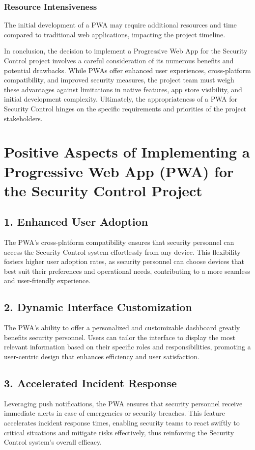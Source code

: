 \documentclass[journal]{IEEEtran}
\begin{document}
	\subsubsection*{Resource Intensiveness}
	The initial development of a PWA may require additional resources and time compared to traditional web applications, impacting the project timeline.
	
	In conclusion, the decision to implement a Progressive Web App for the Security Control project involves a careful consideration of its numerous benefits and potential drawbacks. While PWAs offer enhanced user experiences, cross-platform compatibility, and improved security measures, the project team must weigh these advantages against limitations in native features, app store visibility, and initial development complexity. Ultimately, the appropriateness of a PWA for Security Control hinges on the specific requirements and priorities of the project stakeholders.
	
	\section*{Positive Aspects of Implementing a Progressive Web App (PWA) for the Security Control Project}
	\subsection*{1. Enhanced User Adoption}
	The PWA's cross-platform compatibility ensures that security personnel can access the Security Control system effortlessly from any device. This flexibility fosters higher user adoption rates, as security personnel can choose devices that best suit their preferences and operational needs, contributing to a more seamless and user-friendly experience.
	
	\subsection*{2. Dynamic Interface Customization}
	The PWA's ability to offer a personalized and customizable dashboard greatly benefits security personnel. Users can tailor the interface to display the most relevant information based on their specific roles and responsibilities, promoting a user-centric design that enhances efficiency and user satisfaction.
	
	\subsection*{3. Accelerated Incident Response}
	Leveraging push notifications, the PWA ensures that security personnel receive immediate alerts in case of emergencies or security breaches. This feature accelerates incident response times, enabling security teams to react swiftly to critical situations and mitigate risks effectively, thus reinforcing the Security Control system's overall efficacy.
	
\end{document}
